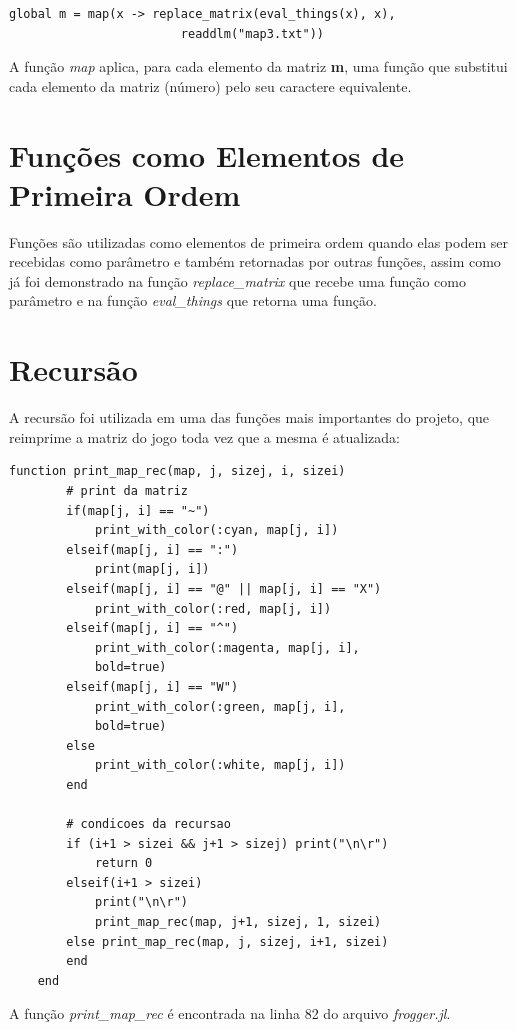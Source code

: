 \documentclass[rel_mlp]{iiufrgs}
\begin{document}
    \begin{lstlisting}[frame=single]
    global m = map(x -> replace_matrix(eval_things(x), x),
                        readdlm("map3.txt"))
    \end{lstlisting}
    
    A função \textit{map} aplica, para cada elemento da matriz \textbf{m}, uma função que substitui cada elemento da matriz (número) pelo seu caractere equivalente.
 
 \section{Funções como Elementos de Primeira Ordem}
 
    Funções são utilizadas como elementos de primeira ordem quando elas podem ser recebidas como parâmetro e também retornadas por outras funções, assim como já foi demonstrado na função \textit{replace\_matrix} que recebe uma função como parâmetro e na função \textit{eval\_things} que retorna uma função.
 
 \section{Recursão}
 
    A recursão foi utilizada em uma das funções mais importantes do projeto, que reimprime a matriz do jogo toda vez que a mesma é atualizada:
  
    \begin{lstlisting}[frame=single]
    function print_map_rec(map, j, sizej, i, sizei)
    	# print da matriz
    	if(map[j, i] == "~")
    	    print_with_color(:cyan, map[j, i])
    	elseif(map[j, i] == ":")			
    		print(map[j, i])
    	elseif(map[j, i] == "@" || map[j, i] == "X")
    		print_with_color(:red, map[j, i])
    	elseif(map[j, i] == "^")
    		print_with_color(:magenta, map[j, i],
    		bold=true)
    	elseif(map[j, i] == "W")
    		print_with_color(:green, map[j, i],
    		bold=true)
    	else
    		print_with_color(:white, map[j, i])
    	end
    
    	# condicoes da recursao
    	if (i+1 > sizei && j+1 > sizej) print("\n\r")
    	    return 0
    	elseif(i+1 > sizei)
    		print("\n\r")
    		print_map_rec(map, j+1, sizej, 1, sizei)
    	else print_map_rec(map, j, sizej, i+1, sizei)
    	end
    end
    \end{lstlisting}
    
    A função \textit{print\_map\_rec} é encontrada na linha 82 do arquivo \textit{frogger.jl}.
    
\end{document}
